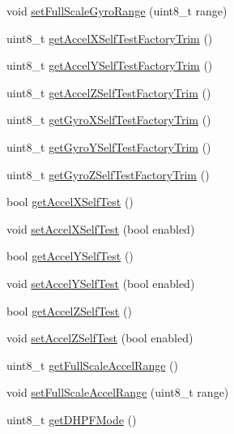 \begin{DoxyCompactItemize}
void \mbox{\hyperlink{class_m_p_u6050_a72afc0b6f221c9336f635b5637c62dae}{set\+Full\+Scale\+Gyro\+Range}} (uint8\+\_\+t range)
\item 
uint8\+\_\+t \mbox{\hyperlink{class_m_p_u6050_a0cfaa7fbf63fb5867e003d490eb3fd96}{get\+Accel\+X\+Self\+Test\+Factory\+Trim}} ()
\item 
uint8\+\_\+t \mbox{\hyperlink{class_m_p_u6050_ae219dc9651d4d42a918e553b03e4e7bf}{get\+Accel\+Y\+Self\+Test\+Factory\+Trim}} ()
\item 
uint8\+\_\+t \mbox{\hyperlink{class_m_p_u6050_a455f63be2ea810cac26d583da6915050}{get\+Accel\+Z\+Self\+Test\+Factory\+Trim}} ()
\item 
uint8\+\_\+t \mbox{\hyperlink{class_m_p_u6050_a9e50a2644c5ac8c9ac4270c86fd18a93}{get\+Gyro\+X\+Self\+Test\+Factory\+Trim}} ()
\item 
uint8\+\_\+t \mbox{\hyperlink{class_m_p_u6050_ae3e0610d6d3bb8162c4d5c99e0f53106}{get\+Gyro\+Y\+Self\+Test\+Factory\+Trim}} ()
\item 
uint8\+\_\+t \mbox{\hyperlink{class_m_p_u6050_a6aecb64dc804f1238e56626ae13b4c79}{get\+Gyro\+Z\+Self\+Test\+Factory\+Trim}} ()
\item 
bool \mbox{\hyperlink{class_m_p_u6050_a8fc7eab1302281f6e4bc953379f3237b}{get\+Accel\+X\+Self\+Test}} ()
\item 
void \mbox{\hyperlink{class_m_p_u6050_ac2ab843dc9d241056ed0f891195cdbf9}{set\+Accel\+X\+Self\+Test}} (bool enabled)
\item 
bool \mbox{\hyperlink{class_m_p_u6050_a2523e798db3baf9cb9dbf347af16639b}{get\+Accel\+Y\+Self\+Test}} ()
\item 
void \mbox{\hyperlink{class_m_p_u6050_ad5847430ab297959e4d0e9b81ba2e3ba}{set\+Accel\+Y\+Self\+Test}} (bool enabled)
\item 
bool \mbox{\hyperlink{class_m_p_u6050_a57710638eeb6176cf14a8c444bda5300}{get\+Accel\+Z\+Self\+Test}} ()
\item 
void \mbox{\hyperlink{class_m_p_u6050_a8eb8ba039af9a47e0475a3835b87f404}{set\+Accel\+Z\+Self\+Test}} (bool enabled)
\item 
uint8\+\_\+t \mbox{\hyperlink{class_m_p_u6050_a0fe2dad60c170cee7d614e08f243ffd0}{get\+Full\+Scale\+Accel\+Range}} ()
\item 
void \mbox{\hyperlink{class_m_p_u6050_a64eb78e8e359c541beaf8664db3421d1}{set\+Full\+Scale\+Accel\+Range}} (uint8\+\_\+t range)
\item 
uint8\+\_\+t \mbox{\hyperlink{class_m_p_u6050_a4c3b84a906fcb5a65870fa557f797f4a}{get\+D\+H\+P\+F\+Mode}} ()

\end{DoxyCompactItemize}
